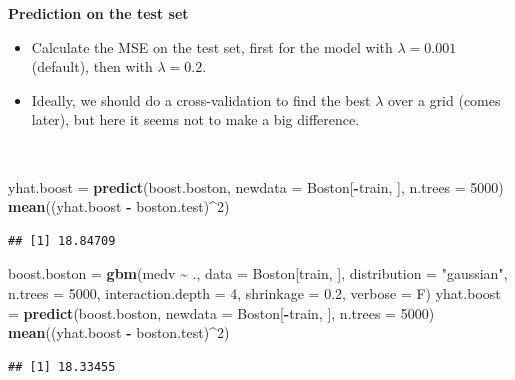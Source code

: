 \documentclass[
  10pt,
  ignorenonframetext,
]{beamer}
\newenvironment{Shaded}{\begin{snugshade}}{\end{snugshade}}
\newcommand{\AttributeTok}[1]{\textcolor[rgb]{0.13,0.29,0.53}{#1}}
\newcommand{\DecValTok}[1]{\textcolor[rgb]{0.00,0.00,0.81}{#1}}
\newcommand{\FloatTok}[1]{\textcolor[rgb]{0.00,0.00,0.81}{#1}}
\newcommand{\FunctionTok}[1]{\textcolor[rgb]{0.13,0.29,0.53}{\textbf{#1}}}
\newcommand{\NormalTok}[1]{#1}
\newcommand{\OtherTok}[1]{\textcolor[rgb]{0.56,0.35,0.01}{#1}}
\newcommand{\SpecialCharTok}[1]{\textcolor[rgb]{0.81,0.36,0.00}{\textbf{#1}}}
\newcommand{\StringTok}[1]{\textcolor[rgb]{0.31,0.60,0.02}{#1}}
\begin{document}
\begin{frame}[fragile]
\textbf{Prediction on the test set}

\begin{itemize}
\item
  Calculate the MSE on the test set, first for the model with
  \(\lambda=0.001\) (default), then with \(\lambda=0.2\).
\item
  Ideally, we should do a cross-validation to find the best \(\lambda\)
  over a grid (comes later), but here it seems not to make a big
  difference.
\end{itemize}

\(~\)

\scriptsize

\begin{Shaded}
\begin{Highlighting}[]
\NormalTok{yhat.boost }\OtherTok{=} \FunctionTok{predict}\NormalTok{(boost.boston, }\AttributeTok{newdata =}\NormalTok{ Boston[}\SpecialCharTok{{-}}\NormalTok{train, ], }\AttributeTok{n.trees =} \DecValTok{5000}\NormalTok{)}
\FunctionTok{mean}\NormalTok{((yhat.boost }\SpecialCharTok{{-}}\NormalTok{ boston.test)}\SpecialCharTok{\^{}}\DecValTok{2}\NormalTok{)}
\end{Highlighting}
\end{Shaded}

\begin{verbatim}
## [1] 18.84709
\end{verbatim}

\vspace{2mm}

\begin{Shaded}
\begin{Highlighting}[]
\NormalTok{boost.boston }\OtherTok{=} \FunctionTok{gbm}\NormalTok{(medv }\SpecialCharTok{\textasciitilde{}}\NormalTok{ ., }\AttributeTok{data =}\NormalTok{ Boston[train, ], }\AttributeTok{distribution =} \StringTok{"gaussian"}\NormalTok{,}
    \AttributeTok{n.trees =} \DecValTok{5000}\NormalTok{, }\AttributeTok{interaction.depth =} \DecValTok{4}\NormalTok{, }\AttributeTok{shrinkage =} \FloatTok{0.2}\NormalTok{, }\AttributeTok{verbose =}\NormalTok{ F)}
\NormalTok{yhat.boost }\OtherTok{=} \FunctionTok{predict}\NormalTok{(boost.boston, }\AttributeTok{newdata =}\NormalTok{ Boston[}\SpecialCharTok{{-}}\NormalTok{train, ], }\AttributeTok{n.trees =} \DecValTok{5000}\NormalTok{)}
\FunctionTok{mean}\NormalTok{((yhat.boost }\SpecialCharTok{{-}}\NormalTok{ boston.test)}\SpecialCharTok{\^{}}\DecValTok{2}\NormalTok{)}
\end{Highlighting}
\end{Shaded}

\begin{verbatim}
## [1] 18.33455
\end{verbatim}
\end{frame}
\end{document}
